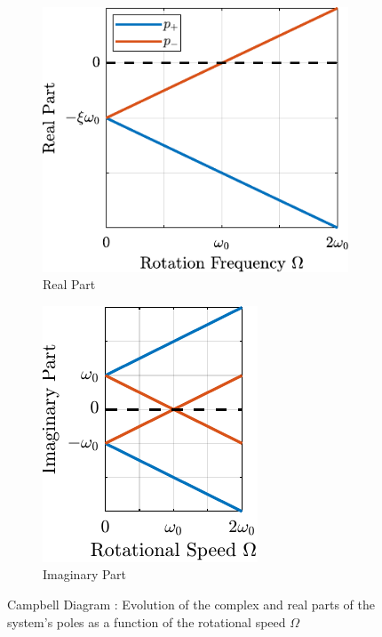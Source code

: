 \documentclass[10pt]{iopart}
\begin{document}
\begin{figure}[htbp]
\begin{subfigure}[c]{0.48\linewidth}
\includegraphics[width=\linewidth]{figs/campbell_diagram_real.pdf}
\caption{\label{fig:campbell_diagram_real} Real Part}
\end{subfigure}
\hfill
\begin{subfigure}[c]{0.48\linewidth}
\includegraphics[width=\linewidth]{figs/campbell_diagram_imag.pdf}
\caption{\label{fig:campbell_diagram_imag} Imaginary Part}
\end{subfigure}
\hfill
\caption{\label{fig:campbell_diagram}Campbell Diagram : Evolution of the complex and real parts of the system's poles as a function of the rotational speed \(\Omega\)}
\centering
\end{figure}
\end{document}
